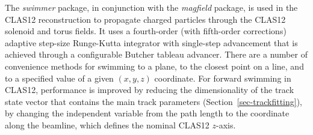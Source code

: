 The {\it swimmer} package, in conjunction with the {\it magfield} package, is used in the CLAS12 reconstruction
to propagate charged particles through the CLAS12 solenoid and torus fields. It uses a fourth-order (with
fifth-order corrections) adaptive step-size Runge-Kutta integrator with single-step advancement that is achieved
through a configurable Butcher tableau advancer. There are a number of convenience methods for swimming to a
plane, to the closest point on a line, and to a specified value of a given $(x,y,z)$ coordinate. For forward swimming
in CLAS12, performance is improved by reducing the dimensionality of the track state vector that contains the main
track parameters (Section~\ref{sec-trackfitting}), by changing the independent variable from the path length 
to the coordinate along the beamline, which defines the nominal CLAS12 $z$-axis.

